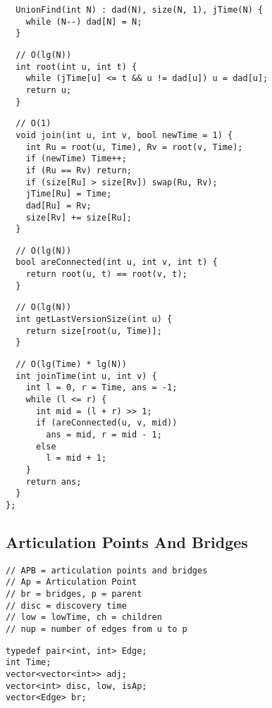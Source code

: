 \documentclass[twoside]{article}
\begin{document}
\begin{multicols*}{2}
\begin{verbatim}
  UnionFind(int N) : dad(N), size(N, 1), jTime(N) {
    while (N--) dad[N] = N;
  }
\end{verbatim}
\vspace{-12pt}
\begin{verbatim}
  // O(lg(N))
  int root(int u, int t) {
    while (jTime[u] <= t && u != dad[u]) u = dad[u];
    return u;
  }
\end{verbatim}
\vspace{-12pt}
\begin{verbatim}
  // O(1)
  void join(int u, int v, bool newTime = 1) {
    int Ru = root(u, Time), Rv = root(v, Time);
    if (newTime) Time++;
    if (Ru == Rv) return;
    if (size[Ru] > size[Rv]) swap(Ru, Rv);
    jTime[Ru] = Time;
    dad[Ru] = Rv;
    size[Rv] += size[Ru];
  }
\end{verbatim}
\vspace{-12pt}
\begin{verbatim}
  // O(lg(N))
  bool areConnected(int u, int v, int t) {
    return root(u, t) == root(v, t);
  }
\end{verbatim}
\vspace{-12pt}
\begin{verbatim}
  // O(lg(N))
  int getLastVersionSize(int u) {
    return size[root(u, Time)];
  }
\end{verbatim}
\vspace{-12pt}
\begin{verbatim}
  // O(lg(Time) * lg(N))
  int joinTime(int u, int v) {
    int l = 0, r = Time, ans = -1;
    while (l <= r) {
      int mid = (l + r) >> 1;
      if (areConnected(u, v, mid))
        ans = mid, r = mid - 1;
      else
        l = mid + 1;
    }
    return ans;
  }
};
\end{verbatim}

\subsectionfont{\large\bfseries\sffamily\underline}
\subsection*{Articulation Points And Bridges}
\begin{verbatim}
// APB = articulation points and bridges
// Ap = Articulation Point
// br = bridges, p = parent
// disc = discovery time
// low = lowTime, ch = children
// nup = number of edges from u to p
\end{verbatim}
\vspace{-12pt}
\begin{verbatim}
typedef pair<int, int> Edge;
int Time;
vector<vector<int>> adj;
vector<int> disc, low, isAp;
vector<Edge> br;


\end{verbatim}
\end{multicols*}
\end{document}
